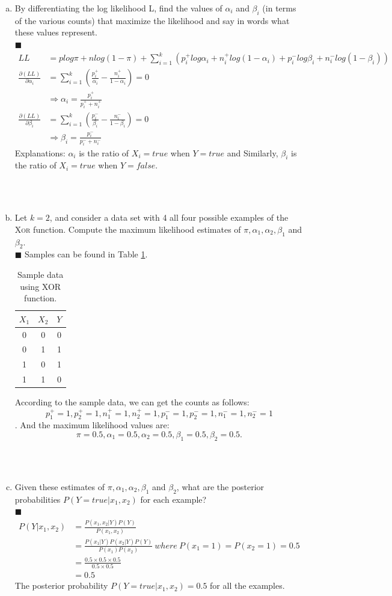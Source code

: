 \documentclass{article}
\newcommand{\solution}[1]{~\\ $\blacksquare$ \sffamily\upshape\selectfont #1
\normalfont ~\\~ }
\begin{document}
\begin{enumerate}[a.]
\item By differentiating the log likelihood L, find the values of
  $\alpha_i$ and $\beta_i$ (in terms of the various counts) that
  maximize the likelihood and say in words what these values represent.
\solution{
  \begin{align*}
    LL & = plog\pi + nlog(1-\pi) + \sum_{i=1}^k(p_i^+log\alpha_i + n_i^+log(1-\alpha_i) 
    + p_i^-log\beta_i + n_i^-log(1 - \beta_i)) \\ 
    \frac{\partial(LL)}{\partial\alpha_i} & = \sum_{i=1}^k(\frac{p_i^+}{\alpha_i} 
    - \frac{n_i^+}{1-\alpha_i}) = 0  \\
    &\Rightarrow \alpha_i=\frac{p_i^+}{p_i^++n_i^+} \\
    \frac{\partial(LL)}{\partial\beta_i} &= \sum_{i=1}^k(\frac{p_i^-}{\beta_i} 
    - \frac{n_i^-}{1-\beta_i}) = 0  \\
    &\Rightarrow \beta_i = \frac{p_i^-}{p_i^-+n_i^-}
  \end{align*}
  Explanations: $\alpha_i$ is the ratio of $X_i=true$ when $Y=true$ and Similarly, 
  $\beta_i$ is the ratio of $X_i=true$ when $Y=false$. 
}
\item Let $k = 2$, and consider a data set with 4 all four possible
examples of the \textsc{Xor} function. Compute the maximum likelihood
estimates of $\pi, \alpha_1, \alpha_2, \beta_1$ and $\beta_2$.
\solution{
  Samples can be found in Table \ref{tbl:1-f}. 
  \begin{table}[h]
    \centering
    \begin{tabular}{ccc}
      \toprule
      \textbf{$X_1$} & \textbf{$X_2$} & \textbf{$Y$} \\ \toprule
      0 & 0 & 0 \\ \midrule
      0 & 1 & 1 \\ \midrule
      1 & 0 & 1 \\ \midrule
      1 & 1 & 0 \\ \bottomrule
    \end{tabular}
    \caption{Sample data using XOR function.}
    \label{tbl:1-f}
  \end{table}

  According to the sample data, we can get the counts as follows: 
  \[p_1^+=1, p_2^+=1, n_1^+=1, n_2^+=1, p_1^-=1, p_2^-=1, n_1^-=1, n_2^-=1\].
  And the maximum likelihood values are: \[\pi = 0.5, \alpha_1 = 0.5, 
  \alpha_2 = 0.5, \beta_1 = 0.5, \beta_2 = 0.5.\]
}
\item Given these estimates of $\pi, \alpha_1, \alpha_2, \beta_1$ and
  $\beta_2$, what are the posterior probabilities $P(Y = true|x_1,x_2)$
  for each example? 
\solution{
  \begin{align*}
    P(Y|x_1,x_2) & = \frac{P(x_1,x_2|Y)P(Y)}{P(x_1,x_2)} \\ 
    & = \frac{P(x_1|Y)P(x_2|Y)P(Y)}{P(x_1)P(x_2)} ~ where ~ P(x_1=1) = P(x_2=1) = 0.5\\ 
    & = \frac{0.5\times 0.5\times 0.5}{0.5\times 0.5} \\ 
    & = 0.5 
  \end{align*}
  The posterior probability $P(Y=true|x_1,x_2) = 0.5$ for all the examples.
}
\end{enumerate}
\end{document}
